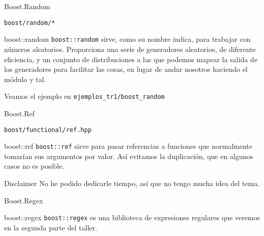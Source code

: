 \documentclass[8pt,xcolor=svgnames]{beamer}
\begin{document}

\begin{frame}{Boost.Random}
  \begin{block}{}
    \texttt{boost/random/*}
  \end{block}
  \begin{block}{boost::random}
    \texttt{boost::random} sirve, como su nombre indica, para trabajar
    con números aleatorios. Proporciona una serie de generadores
    aleatorios, de diferente eficiencia, y un conjunto de
    distribuciones a las que podemos mapear la salida de los
    generadores para facilitar las cosas, en lugar de andar nosotros
    haciendo el módulo y tal.
  \end{block}  
  \pause
  \begin{block}{}
    Veamos el ejemplo en \texttt{ejemplos\_tr1/boost\_random}
  \end{block}  
\end{frame}


\begin{frame}{Boost.Ref}
  \begin{block}{}
    \texttt{boost/functional/ref.hpp}
  \end{block}
  \begin{block}{boost::ref}
    \texttt{boost::ref} sirve para pasar referencias a funciones que
    normalmente tomarían sus argumentos por valor. Así evitamos la
    duplicación, que en algunos casos no es posible.
  \end{block}
  \begin{alertblock}{Disclaimer}
    No he podido dedicarle tiempo, así que no tengo mucha idea del
    tema.
  \end{alertblock}
\end{frame}


\begin{frame}{Boost.Regex}
  \begin{block}{boost::regex}
    \texttt{boost::regex} es una biblioteca de expresiones regulares
    que veremos en la segunda parte del taller.
  \end{block}
\end{frame}
\end{document}
